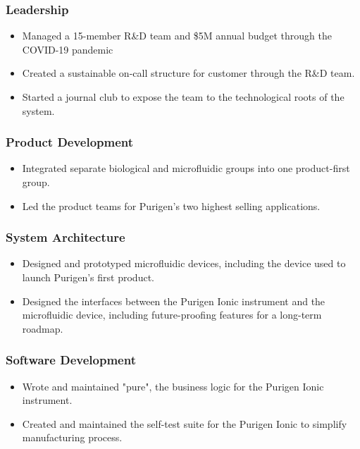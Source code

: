 \documentclass{res}
\begin{document}
\begin{resume}
   \vspace{-0.1in}
    \subsubsection{Leadership}
       \begin{itemize}
        \item Managed a 15-member R\&D team and \$5M annual budget through the COVID-19 pandemic
        \item Created a sustainable on-call structure for customer through the R\&D team.
        \item Started a journal club to expose the team to the technological roots of the system.
       \end{itemize}
   \vspace{-0.1in}
    \subsubsection{Product Development}
      \begin{itemize}
       \item Integrated separate biological and microfluidic groups into one product-first group.
       \item Led the product teams for Purigen's two highest selling applications.
      \end{itemize}
   \vspace{-0.1in}
    \subsubsection{System Architecture}
      \begin{itemize}
        \item Designed and prototyped microfluidic devices, including the device used to launch Purigen's first product.
        \item Designed the interfaces between the Purigen Ionic instrument and the microfluidic device, including future-proofing features for a long-term roadmap.
      \end{itemize}
   \vspace{-0.1in}
    \subsubsection{Software Development}
      \begin{itemize}
        \item Wrote and maintained "pure", the business logic for the Purigen Ionic instrument.
        \item Created and maintained the self-test suite for the Purigen Ionic to simplify manufacturing process.
      \end{itemize}
   \vspace{-0.1in}

\end{resume}
\end{document}
